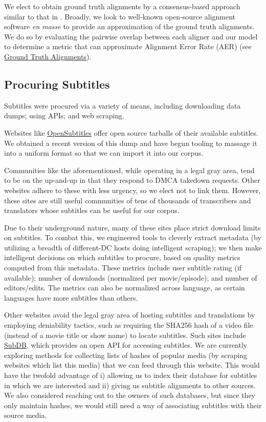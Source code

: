 \documentclass[twoside,twocolumn]{article}
\begin{document}
We elect to obtain ground truth alignments by a consensus-based
approach similar to that in \cite{liu2015streaming}. Broadly, we look to
well-known open-source alignment software \textit{en masse} to provide an approximation of the ground truth alignments.
We do so by evaluating the pairwise overlap between
each aligner and our model to determine a metric that can approximate
Alignment Error Rate (AER) (see
\hyperref[subsec:ground-truth-alignments]{Ground Truth Alignments}).

\subsection{Procuring Subtitles}
\label{subsec:procuring-subtitles}

Subtitles were procured via a variety of means, including downloading data
dumps; using APIs; and web scraping.

Websites like \href{https://www.opensubtitles.org/}{OpenSubtitles} offer
open source tarballs of their available subtitles. We obtained
a recent version of this dump and have begun tooling to massage it into a
uniform format so that we can import it into our corpus.

Communities like the aforementioned, while operating in a legal gray area, tend
to be on the up-and-up in that they respond to DMCA takedown requests. Other
websites adhere to these with less urgency, so we elect not to link them.
However, these sites are still useful communities of tens of thousands of
transcribers and translators whose subtitles can be useful for our corpus.

Due to their underground nature, many of these sites place strict download
limits on subtitles. To combat this, we engineered tools to cleverly extract metadata (by utilizing a breadth of different-DC hosts doing intelligent
scraping); we then make intelligent decisions on which subtitles to procure,
based on quality metrics computed from this metadata. These metrics include user subtitle rating (if available); number of downloads (normalized per
movie/episode); and number of editors/edits. The metrics can also be normalized across language, as certain languages have more subtitles than others.

Other websites avoid the legal gray area of hosting subtitles and translations
by employing deniability tactics, such as requiring the SHA256 hash of a video
file (instead of a movie title or show name) to locate subtitles. Such sites
include \href{http://thesubdb.com/}{SubDB}, which provides an open API for
accessing subtitles. We are currently exploring methods for collecting lists of
hashes of popular media (by scraping websites which list this media) that we
can feed through this website. This would have the twofold advantage of
i) allowing us to index their database for subtitles in which we are interested
and ii) giving us subtitle alignments to other sources. We also considered
reaching out to the owners of such databases, but since they only maintain
hashes, we would still need a way of associating subtitles with their source
media.
\end{document}
